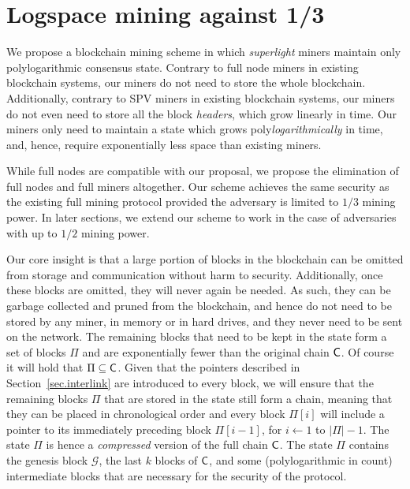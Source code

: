 \section{Logspace mining against 1/3}\label{sec.mining13}

We propose a blockchain mining scheme in which \emph{superlight} miners maintain
only polylogarithmic consensus state. Contrary to full node miners in existing
blockchain systems, our miners do not need to store the whole blockchain.
Additionally, contrary to SPV miners in existing blockchain systems, our miners
do not even need to store all the block \emph{headers}, which grow linearly in
time. Our miners only need to maintain a state which grows
poly\emph{logarithmically} in time, and, hence, require exponentially less space
than existing miners.

While full nodes are compatible with our proposal, we propose the elimination of
full nodes and full miners altogether. Our scheme achieves the same security as
the existing full mining protocol provided the adversary is limited to $1/3$
mining power. In later sections, we extend our scheme to work in the case of
adversaries with up to $1/2$ mining power.

Our core insight is that a large portion of blocks in the blockchain can be
omitted from storage and communication without harm to security. Additionally,
once these blocks are omitted, they will never again be needed. As such, they
can be garbage collected and pruned from the blockchain, and hence do not need
to be stored by any miner, in memory or in hard drives, and they never need to
be sent on the network. The remaining blocks that need to be kept in the state
form a set of blocks $\Pi$ and are exponentially fewer than the original chain
$\mathsf{C}$. Of course it will hold that $\Pi \subseteq \mathsf{C}$. Given that the
pointers described in Section~\ref{sec.interlink} are introduced to every block,
we will ensure that the remaining blocks $\Pi$ that are stored in the state
still form a chain, meaning that they can be placed in chronological order and
every block $\Pi[i]$ will include a pointer to its immediately preceding block
$\Pi[i - 1]$, for $i \gets 1$ to $|\Pi| - 1$. The state $\Pi$ is hence a
\emph{compressed} version of the full chain $\mathsf{C}$. The state $\Pi$ contains
the genesis block $\mathcal{G}$, the last $k$ blocks of $\mathsf{C}$, and some
(polylogarithmic in count) intermediate blocks that are necessary for the
security of the protocol.

